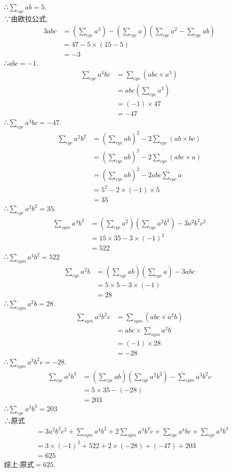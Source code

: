 \documentclass[UTF8]{ctexart}
\begin{document}
∴$\sum\limits_{cyc}{ab}=5$.\\%
∵由欧拉公式,
\begin{align*}
3abc&=(\sum\limits_{cyc}{a^3})-(\sum\limits_{cyc}{a})(\sum\limits_{cyc}{a^2}-\sum\limits_{cyc}{ab})\\
&=47-5\times (15-5)\\
&=-3
\end{align*}
∴$abc=-1$.%
\begin{align*}
\sum\limits_{cyc}{a^4bc}&=\sum\limits_{cyc}{(abc\times a^3)}\\
&=abc(\sum\limits_{cyc}{a^3})\\
&=(-1)\times47\\
&=-47
\end{align*}
∴$\sum\limits_{cyc}{a^4bc}=-47$.%
\begin{align*}
\sum\limits_{cyc}{a^2b^2}&=(\sum\limits_{cyc}{ab})^2-2\sum\limits_{cyc}{(ab\times bc)}\\
&=(\sum\limits_{cyc}{ab})^2-2\sum\limits_{cyc}{(abc\times a)}\\
&=(\sum\limits_{cyc}{ab})^2-2abc\sum\limits_{cyc}{a}\\
&=5^2-2\times (-1)\times 5\\
&=35\end{align*}
∴$\sum\limits_{cyc}{a^2b^2}=35$.%
\begin{align*}
\sum\limits_{sym}{a^4b^2}&=(\sum\limits_{cyc}{a^2})(\sum\limits_{cyc}{a^2b^2})-3a^2b^2c^2\\&=15\times 35-3\times(-1)^2\\&=522
\end{align*}
∴$\sum\limits_{sym}{a^4b^2}=522$%
\begin{align*}
\sum\limits_{cyc}{a^2b}&=(\sum\limits_{cyc}{ab})(\sum\limits_{cyc}{a})-3abc\\
&=5\times 5-3\times(-1)\\
&=28
\end{align*}
∴$\sum\limits_{sym}{a^2b}=28$.%
\begin{align*}
\sum\limits_{sym}{a^3b^2c}&=\sum\limits_{sym}{(abc\times a^2b)}\\
&=abc\times\sum\limits_{sym}{a^2b}\\
&=(-1)\times 28\\
&=-28
\end{align*}
∴$\sum\limits_{sym}a^3b^2c=-28$.%
\begin{align*}
\sum\limits_{cyc}{a^3b^3}&=(\sum\limits_{cyc}{ab})(\sum\limits_{cyc}{a^2b^2})-\sum\limits_{sym}{a^3b^2c}\\
&=5\times35-(-28)\\
&=203
\end{align*}
∴$\sum\limits_{cyc}{a^3b^3}=203$\\%
∴原式
\begin{align*}
&=3a^2b^2c^2+\sum\limits_{sym}{a^4b^2}+2\sum\limits_{sym}{a^3b^2c}+\sum\limits_{cyc}{a^4bc}+\sum\limits_{cyc}{a^3b^3}\\
&=3\times(-1)^2+522+2\times(-28)+(-47)+203\\
&=625
\end{align*}
综上:原式$=625$.
\end{document}

